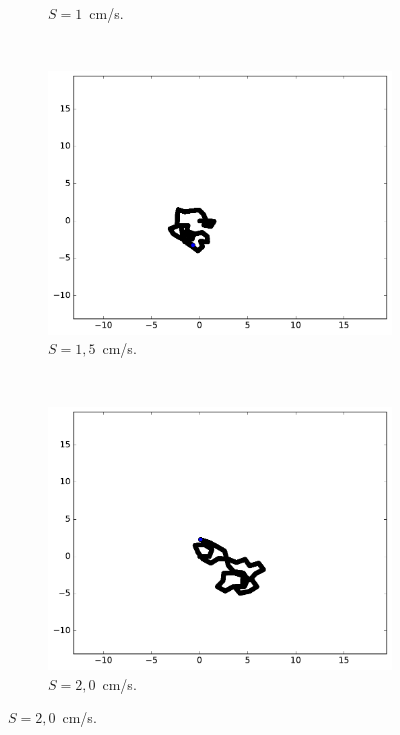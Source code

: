 \begin{figure}[htb]
\begin{subfigure}[t]{\subImgWarea}
			\caption[$S = 1$]{$S = 1$~cm/s.}
			\label{fig:spTraj_1_0_120_2}
		\end{subfigure}
		~
		\begin{subfigure}[t]{\subImgWarea}
			\centering
			\includegraphics[width=\textwidth]{figures/ch3/spTraj_1_5_120_2}
			\caption[$S = 1,5$]{$S = 1,5$~cm/s.}
			\label{fig:spTraj_1_5_120_2}
		\end{subfigure}
		~
		\begin{subfigure}[t]{\subImgWarea}
			\centering
			\includegraphics[width=\textwidth]{figures/ch3/spTraj_2_0_120_2}
			\caption[$S = 2,0$]{$S = 2,0$~cm/s.}
			\label{fig:spTraj_2_0_120_2}
		\end{subfigure}

\end{figure}
